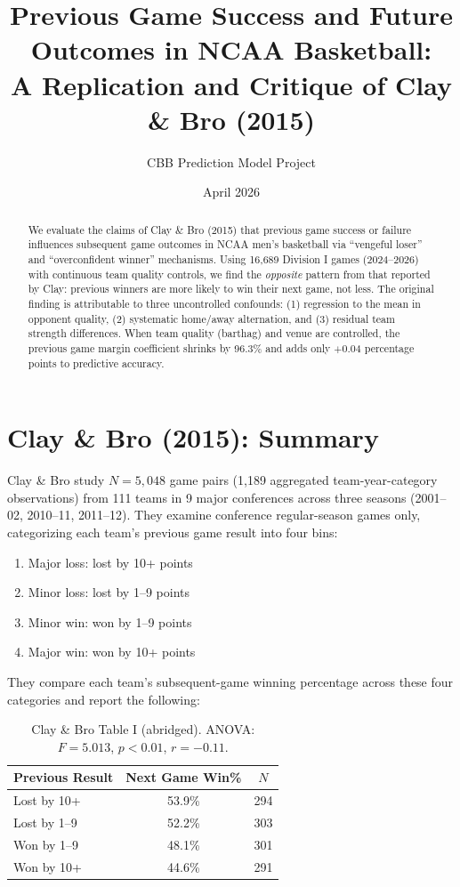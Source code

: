 \documentclass[11pt]{article}
\title{Previous Game Success and Future Outcomes in NCAA Basketball:\\A Replication and Critique of Clay \& Bro (2015)}
\author{CBB Prediction Model Project}
\date{April 2026}
\begin{document}
\maketitle

\begin{abstract}
We evaluate the claims of Clay \& Bro (2015) that previous game success or failure influences subsequent game outcomes in NCAA men's basketball via ``vengeful loser'' and ``overconfident winner'' mechanisms. Using 16,689 Division I games (2024--2026) with continuous team quality controls, we find the \emph{opposite} pattern from that reported by Clay: previous winners are more likely to win their next game, not less. The original finding is attributable to three uncontrolled confounds: (1) regression to the mean in opponent quality, (2) systematic home/away alternation, and (3) residual team strength differences. When team quality (barthag) and venue are controlled, the previous game margin coefficient shrinks by 96.3\% and adds only $+$0.04 percentage points to predictive accuracy.
\end{abstract}

\section{Clay \& Bro (2015): Summary}

Clay \& Bro study $N = 5{,}048$ game pairs (1,189 aggregated team-year-category observations) from 111 teams in 9 major conferences across three seasons (2001--02, 2010--11, 2011--12). They examine conference regular-season games only, categorizing each team's previous game result into four bins:

\begin{enumerate}
    \item Major loss: lost by 10+ points
    \item Minor loss: lost by 1--9 points
    \item Minor win: won by 1--9 points
    \item Major win: won by 10+ points
\end{enumerate}

\noindent They compare each team's subsequent-game winning percentage across these four categories and report the following:

\begin{table}[h]
\centering
\begin{tabular}{lcc}
\toprule
Previous Result & Next Game Win\% & $N$ \\
\midrule
Lost by 10+ & 53.9\% & 294 \\
Lost by 1--9 & 52.2\% & 303 \\
Won by 1--9 & 48.1\% & 301 \\
Won by 10+ & 44.6\% & 291 \\
\bottomrule
\end{tabular}
\caption{Clay \& Bro Table I (abridged). ANOVA: $F = 5.013$, $p < 0.01$, $r = -0.11$.}
\label{tab:clay_original}
\end{table}
\end{document}
